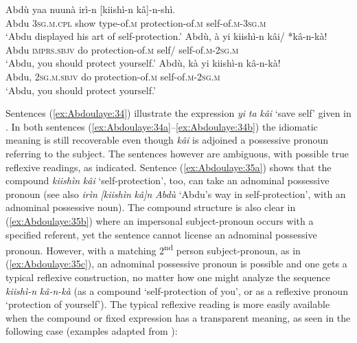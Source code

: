 \documentclass[output=paper]{langscibook}
\begin{document}
\ea%
    \label{ex:Abdoulaye:35}
    \ea  \label{ex:Abdoulaye:35a}
    \gll  Abdù  yaa  nuunà  irì-n  [kiishì-n  kâ]-n-shì.\\
    Abdu  \textsc{3sg.m.cpl}  show  type-of.\textsc{m}  protection-of.\textsc{m}  self-of.\textsc{m-3sg.m}\\
    \glt `Abdu displayed his art of self-protection.’
    \ex \label{ex:Abdoulaye:35b}
    \gll  Abdù,  à  yi  kiishì-n  kâi/  *kâ-n-kà!\\
    Abdu  \textsc{imprs.sbjv}  do  protection-of.\textsc{m}  self/  self-of.\textsc{m-2sg.m}\\
    \glt `Abdu, you should protect yourself.’
    \ex \label{ex:Abdoulaye:35c}
    \gll   Abdù,  kà  yi  kiishì-n  kâ-n-kà!\\
    Abdu,  \textsc{2sg.m.sbjv}  do  protection-of.\textsc{m}  self-of.\textsc{m-2sg.m}\\
    \glt `Abdu, you should protect yourself.’
    \z
\z
 
   

Sentences (\ref{ex:Abdoulaye:34}) illustrate the expression \textit{yi} \textit{ta} \textit{kâi} ‘save self’ given in . In both sentences (\ref{ex:Abdoulaye:34a}--\ref{ex:Abdoulaye:34b}) the idiomatic meaning is still recoverable even though \textit{kâi} is adjoined a possessive pronoun referring to the subject. The sentences however are ambiguous, with possible true reflexive readings, as indicated.  Sentence (\ref{ex:Abdoulaye:35a}) shows that the compound \textit{kiishìn} \textit{kâi} ‘self-protection’, too, can take an adnominal possessive pronoun (see also \textit{irìn} \textit{[kiishìn} \textit{kâ]n} \textit{Abdù} ‘Abdu’s way in self-protection’, with an adnominal possessive noun). The compound structure is also clear in (\ref{ex:Abdoulaye:35b}) where an impersonal subject-pronoun occurs with a specified referent, yet the sentence cannot license an adnominal possessive pronoun. However, with a matching 2\textsuperscript{nd} person subject-pronoun, as in (\ref{ex:Abdoulaye:35c}), an adnominal possessive pronoun is possible and one gets a typical reflexive construction, no matter how one might analyze the sequence \textit{kiishì-n} \textit{kâ-n-kà} (as a compound ‘self-protection of you’, or as a reflexive pronoun ‘protection of yourself’). The typical reflexive reading is more easily available when the compound or fixed expression has a transparent meaning, as seen in the following case (examples adapted from \citealt[523]{Newman2000}):
\end{document}
